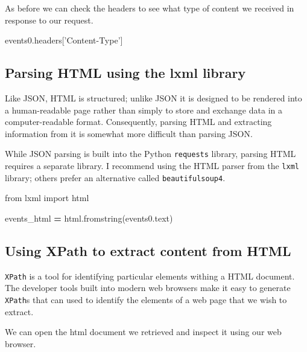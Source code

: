 \documentclass[
]{book}
\newenvironment{Shaded}{\begin{snugshade}}{\end{snugshade}}
\newcommand{\ImportTok}[1]{#1}
\newcommand{\NormalTok}[1]{#1}
\newcommand{\OperatorTok}[1]{\textcolor[rgb]{0.81,0.36,0.00}{\textbf{#1}}}
\newcommand{\StringTok}[1]{\textcolor[rgb]{0.31,0.60,0.02}{#1}}
\begin{document}
As before we can check the headers to see what type of content we
received in response to our request.

\begin{Shaded}
\begin{Highlighting}[]
\NormalTok{events0.headers[}\StringTok{'Content-Type'}\NormalTok{]}
\end{Highlighting}
\end{Shaded}

\hypertarget{parsing-html-using-the-lxml-library}{%
\subsection{Parsing HTML using the lxml library}\label{parsing-html-using-the-lxml-library}}

Like JSON, HTML is structured; unlike JSON it is designed to be
rendered into a human-readable page rather than simply to store and
exchange data in a computer-readable format. Consequently, parsing
HTML and extracting information from it is somewhat more difficult
than parsing JSON.

While JSON parsing is built into the Python \texttt{requests} library, parsing
HTML requires a separate library. I recommend using the HTML parser
from the \texttt{lxml} library; others prefer an alternative called
\texttt{beautifulsoup4}.

\begin{Shaded}
\begin{Highlighting}[]
\ImportTok{from}\NormalTok{ lxml }\ImportTok{import}\NormalTok{ html}

\NormalTok{events_html }\OperatorTok{=}\NormalTok{ html.fromstring(events0.text)}
\end{Highlighting}
\end{Shaded}

\hypertarget{using-xpath-to-extract-content-from-html}{%
\subsection{Using XPath to extract content from HTML}\label{using-xpath-to-extract-content-from-html}}

\texttt{XPath} is a tool for identifying particular elements withing a HTML
document. The developer tools built into modern web browsers make it
easy to generate \texttt{XPath}s that can used to identify the elements of a
web page that we wish to extract.

We can open the html document we retrieved and inspect it using
our web browser.
\end{document}
